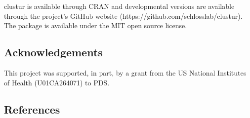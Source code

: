 \documentclass[
  11pt,
]{article}
\begin{document}
clustur is available through CRAN and developmental versions are
available through the project's GitHub website
(https://github.com/schlosslab/clustur). The package is available under
the MIT open source license.

\subsection{Acknowledgements}\label{acknowledgements}

This project was supported, in part, by a grant from the US National
Institutes of Health (U01CA264071) to PDS.

\newpage

\subsection{References}\label{references}
\end{document}
